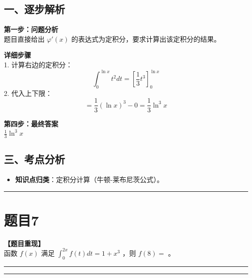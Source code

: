 \documentclass[12pt, a4paper]{ctexart}
\newcommand{\TopSeparator}{
    \par\noindent\rule{\textwidth}{1.5pt}\vspace{0.5em} %
}
\newcommand{\AnalysisSeparator}{
    \par\noindent\rule{\textwidth}{0.5pt}\vspace{0.2em}\hrule\vspace{0.5em} %
}
\newenvironment{RedAnalysis}{
    \par
    \color{red} %
}{
    \par
    \color{black} %
}
\begin{document}
\begin{RedAnalysis}

\subsection*{一、逐步解析}

\textbf{第一步：问题分析} \\
题目直接给出 $\varphi'(x)$ 的表达式为定积分，要求计算出该定积分的结果。

\textbf{详细步骤} \\
1. 计算右边的定积分：
   \[ \int_0^{\ln x} t^2 dt = [\frac{1}{3}t^3]_0^{\ln x} \]
2. 代入上下限：
   \[ = \frac{1}{3}(\ln x)^3 - 0 = \frac{1}{3}\ln^3 x \]

\textbf{第四步：最终答案} \\
$ \frac{1}{3}\ln^3 x $

\subsection*{三、考点分析}
\begin{itemize}
    \item \textbf{知识点归类}：定积分计算（牛顿-莱布尼茨公式）。
\end{itemize}

\end{RedAnalysis}

\vspace{2em}

\TopSeparator
\section*{题目7}

\textbf{【题目重现】} \\
函数 $ f(x) $ 满足 $ \int_{0}^{2x} f(t) dt = 1 + x^{3} $ ，则 $ f(8) = $ \underline{\hspace{2cm}}。

\AnalysisSeparator
\end{document}
